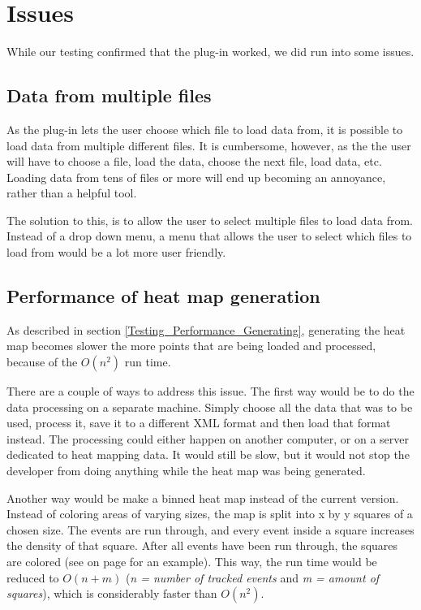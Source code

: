\section{Issues}
\label{Issues}

While our testing confirmed that the plug-in worked, we did run into some issues.

\subsection{Data from multiple files}
\label{Issues_MultipleFiles}

As the plug-in lets the user choose which file to load data from, it is possible to load data from multiple different files. It is cumbersome, however, as the the user will have to choose a file, load the data, choose the next file, load data, etc. Loading data from tens of files or more will end up becoming an annoyance, rather than a helpful tool.

The solution to this, is to allow the user to select multiple files to load data from. Instead of a drop down menu, a menu that allows the user to select which files to load from would be a lot more user friendly.

\subsection{Performance of heat map generation}
\label{Issues_GenerationPerformance}

As described in section \ref{Testing_Performance_Generating}, generating the heat map becomes slower the more points that are being loaded and processed, because of the $O(n^2)$ run time.

There are a couple of ways to address this issue. The first way would be to do the data processing on a separate machine. Simply choose all the data that was to be used, process it, save it to a different XML format and then load that format instead. The processing could either happen on another computer, or on a server dedicated to heat mapping data. It would still be slow, but it would not stop the developer from doing anything while the heat map was being generated.

Another way would be make a binned heat map instead of the current version. Instead of coloring areas of varying sizes, the map is split into x by y squares of a chosen size. The events are run through, and every event inside a square increases the density of that square. After all events have been run through, the squares are colored (see  on page \pageref{fig:HM_B} for an example). This way, the run time would be reduced to $O(n + m)$ (\textit{n = number of tracked events} and \textit{m = amount of squares}), which is considerably faster than $O(n^2)$.

